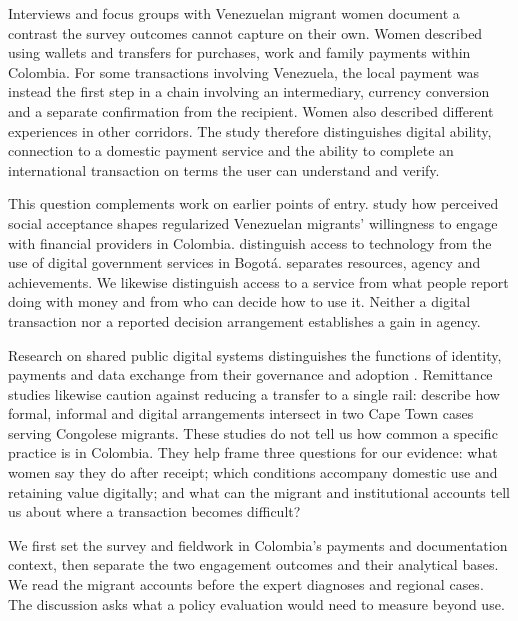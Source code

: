 \documentclass[12pt]{article}
\begin{document}
Interviews and focus groups with Venezuelan migrant women document a contrast the survey outcomes cannot capture on their own. Women described using wallets and transfers for purchases, work and family payments within Colombia. For some transactions involving Venezuela, the local payment was instead the first step in a chain involving an intermediary, currency conversion and a separate confirmation from the recipient. Women also described different experiences in other corridors. The study therefore distinguishes digital ability, connection to a domestic payment service and the ability to complete an international transaction on terms the user can understand and verify.

This question complements work on earlier points of entry. \citet{barboni2025} study how perceived social acceptance shapes regularized Venezuelan migrants' willingness to engage with financial providers in Colombia. \citet{martinshields2022} distinguish access to technology from the use of digital government services in Bogotá. \citet{kabeer1999} separates resources, agency and achievements. We likewise distinguish access to a service from what people report doing with money and from who can decide how to use it. Neither a digital transaction nor a reported decision arrangement establishes a gain in agency.

Research on shared public digital systems distinguishes the functions of identity, payments and data exchange from their governance and adoption \citep{eavesrao2025}. Remittance studies likewise caution against reducing a transfer to a single rail: \citet{cirolia2022} describe how formal, informal and digital arrangements intersect in two Cape Town cases serving Congolese migrants. These studies do not tell us how common a specific practice is in Colombia. They help frame three questions for our evidence: what women say they do after receipt; which conditions accompany domestic use and retaining value digitally; and what can the migrant and institutional accounts tell us about where a transaction becomes difficult?

We first set the survey and fieldwork in Colombia's payments and documentation context, then separate the two engagement outcomes and their analytical bases. We read the migrant accounts before the expert diagnoses and regional cases. The discussion asks what a policy evaluation would need to measure beyond use.

\end{document}
